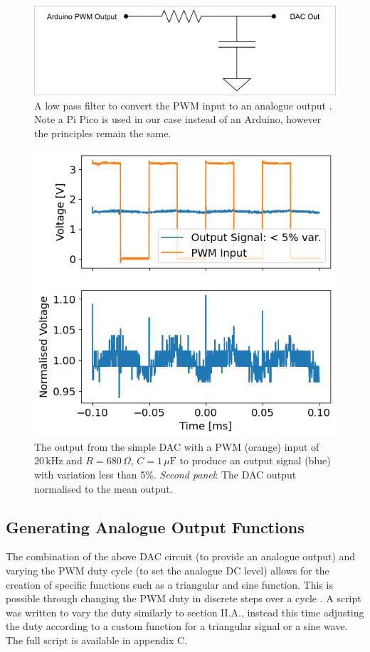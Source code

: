 \documentclass[%
 reprint,
 amsmath,amssymb,
 aps,
]{revtex4-2}
\begin{document}
    \begin{figure}
        \includegraphics[width=0.9\columnwidth]{Images/dac.png}
        \caption{\label{fig:DAC}A low pass filter to convert the PWM input to an analogue output \cite{ucd}. Note a Pi Pico is used in our case instead of an Arduino, however the principles remain the same.}
    \end{figure}
    \begin{figure}
        \includegraphics[width=0.9\columnwidth]{Images/dacVariations.png}
    \caption{\label{fig:dacVariations} The output from the simple DAC with a PWM (orange) input of $20\,\text{kHz}$ and $R=680\,\Omega$, $C=1\,\mu\text{F}$ to produce an output signal (blue) with variation less than 5\%. \textit{Second panel}: The DAC output normalised to the mean output.}
    \end{figure}

    \subsection{Generating Analogue Output Functions}
    The combination of the above DAC circuit (to provide an analogue output) and varying the PWM duty cycle (to set the analogue DC level) allows for the creation of specific functions such as a triangular and sine function. This is possible through changing the PWM duty in discrete steps over a cycle \cite{ucd}. A script was written to vary the duty similarly to section II.A., instead this time adjusting the duty according to a custom function for a triangular signal or a sine wave. The full script is available in appendix C.
\end{document}
